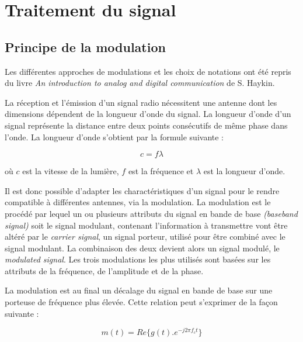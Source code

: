\section{Traitement du signal}

\subsection{Principe de la modulation}\label{mod}

Les différentes approches de modulations et les choix de notations ont été repris du livre \textit{An introduction to analog and digital communication} de S. Haykin\cite{book1}.

\vspace{0.1cm}

La réception et l'émission d'un signal radio nécessitent une antenne dont les dimensions dépendent de la longueur d'onde du signal. La longueur d'onde d'un signal représente la distance entre deux points consécutifs de même phase dans l'onde. La longueur d'onde s'obtient par la formule suivante :

\begin{equation}\label{eq1}
c = f \lambda
\end{equation}

où $c$ est la vitesse de la lumière, $f$ est la fréquence et $\lambda$ est la longueur d'onde.

\vspace{0.1cm}

Il est donc possible d'adapter les charactéristiques d'un signal pour le rendre compatible à différentes antennes, via la modulation. La modulation est le procédé par lequel un ou plusieurs attributs du signal en bande de base \textit{(baseband signal)} soit le signal modulant, contenant l'information à transmettre vont être altéré par le \textit{carrier signal}, un signal porteur, utilisé pour être combiné avec le signal modulant. La combinaison des deux devient alors un signal modulé, le \textit{modulated signal}. Les trois modulations les plus utilisés sont basées sur les attributs de la fréquence, de l'amplitude et de la phase.

\vspace{0.1cm}

La modulation est au final un décalage du signal en bande de base sur une porteuse de fréquence plus élevée. Cette relation peut s'exprimer de la façon suivante : 

\begin{equation}\label{eq110}
m(t) = Re\{ g(t).e^{-j2\pi f_c t}\}
\end{equation}


